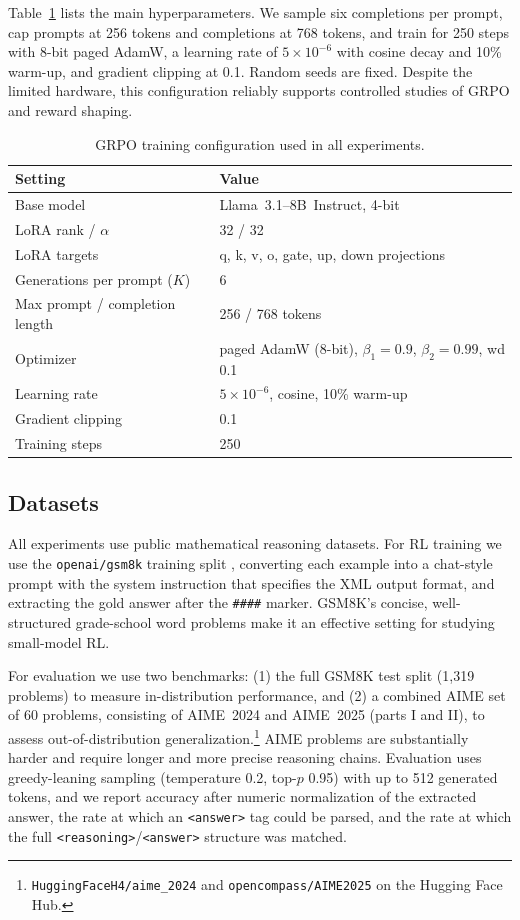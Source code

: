 \documentclass{article}
\begin{document}
Table~\ref{tab:hparams} lists the main hyperparameters. We sample six completions per prompt, cap prompts at 256 tokens and completions at 768 tokens, and train for 250 steps with 8-bit paged AdamW, a learning rate of $5\times10^{-6}$ with cosine decay and 10\% warm-up, and gradient clipping at 0.1. Random seeds are fixed. Despite the limited hardware, this configuration reliably supports controlled studies of GRPO and reward shaping.

\begin{table}[t]
\centering
\begin{tabular}{ll}
\toprule
\textbf{Setting} & \textbf{Value} \\
\midrule
Base model & Llama~3.1--8B~Instruct, 4-bit \\
LoRA rank / $\alpha$ & 32 / 32 \\
LoRA targets & q, k, v, o, gate, up, down projections \\
Generations per prompt ($K$) & 6 \\
Max prompt / completion length & 256 / 768 tokens \\
Optimizer & paged AdamW (8-bit), $\beta_1{=}0.9$, $\beta_2{=}0.99$, wd 0.1 \\
Learning rate & $5\times10^{-6}$, cosine, 10\% warm-up \\
Gradient clipping & 0.1 \\
Training steps & 250 \\
\bottomrule
\end{tabular}
\medskip
\caption{GRPO training configuration used in all experiments.}
\label{tab:hparams}
\end{table}

\subsection{Datasets}

All experiments use public mathematical reasoning datasets. For RL training we use the \texttt{openai/gsm8k} training split \cite{cobbe2021gsm8k}, converting each example into a chat-style prompt with the system instruction that specifies the XML output format, and extracting the gold answer after the \texttt{\#\#\#\#} marker. GSM8K's concise, well-structured grade-school word problems make it an effective setting for studying small-model RL.

For evaluation we use two benchmarks: (1) the full GSM8K test split (1{,}319 problems) to measure in-distribution performance, and (2) a combined AIME set of 60 problems, consisting of AIME~2024 and AIME~2025 (parts I and II), to assess out-of-distribution generalization.\footnote{\texttt{HuggingFaceH4/aime\_2024} and \texttt{opencompass/AIME2025} on the Hugging Face Hub.} AIME problems are substantially harder and require longer and more precise reasoning chains. Evaluation uses greedy-leaning sampling (temperature 0.2, top-$p$ 0.95) with up to 512 generated tokens, and we report accuracy after numeric normalization of the extracted answer, the rate at which an \texttt{<answer>} tag could be parsed, and the rate at which the full \texttt{<reasoning>}/\texttt{<answer>} structure was matched.
\end{document}
